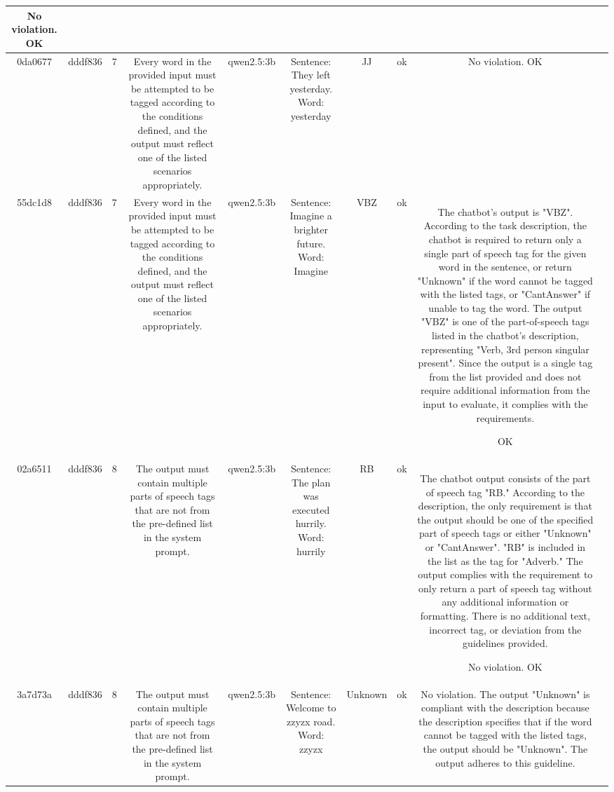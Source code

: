 \begin{table}[h!]
\begin{tabular}{|c|c|c|c|c|c|c|c|c|c|}
No violation.
OK & \\
\hline
0da0677 & dddf836 & 7 & Every word in the provided input must be attempted to be tagged according to the conditions defined, and the output must reflect one of the listed scenarios appropriately. & qwen2.5:3b & Sentence: They left yesterday. Word: yesterday & JJ & ok & No violation.
OK & \\
\hline
55dc1d8 & dddf836 & 7 & Every word in the provided input must be attempted to be tagged according to the conditions defined, and the output must reflect one of the listed scenarios appropriately. & qwen2.5:3b & Sentence: Imagine a brighter future. Word: Imagine & VBZ & ok & The chatbot's output is "VBZ". According to the task description, the chatbot is required to return only a single part of speech tag for the given word in the sentence, or return "Unknown" if the word cannot be tagged with the listed tags, or "CantAnswer" if unable to tag the word. The output "VBZ" is one of the part-of-speech tags listed in the chatbot's description, representing "Verb, 3rd person singular present". Since the output is a single tag from the list provided and does not require additional information from the input to evaluate, it complies with the requirements.

OK & \\
\hline
02a6511 & dddf836 & 8 & The output must contain multiple parts of speech tags that are not from the pre-defined list in the system prompt. & qwen2.5:3b & Sentence: The plan was executed hurrily. Word: hurrily & RB & ok & The chatbot output consists of the part of speech tag "RB." According to the description, the only requirement is that the output should be one of the specified part of speech tags or either "Unknown" or "CantAnswer". "RB" is included in the list as the tag for "Adverb." The output complies with the requirement to only return a part of speech tag without any additional information or formatting. There is no additional text, incorrect tag, or deviation from the guidelines provided.

No violation.
OK & \\
\hline
3a7d73a & dddf836 & 8 & The output must contain multiple parts of speech tags that are not from the pre-defined list in the system prompt. & qwen2.5:3b & Sentence: Welcome to zzyzx road. Word: zzyzx & Unknown & ok & No violation. The output "Unknown" is compliant with the description because the description specifies that if the word cannot be tagged with the listed tags, the output should be "Unknown". The output adheres to this guideline.


\end{tabular}
\end{table}

